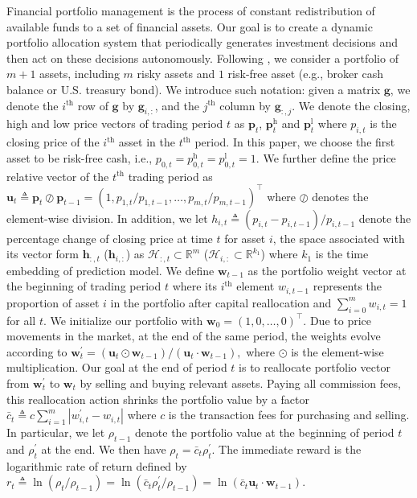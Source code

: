 \documentclass{article}
\begin{document}
Financial portfolio management is the process of constant redistribution of available funds to a set of financial assets. Our goal is to create a dynamic portfolio allocation system that periodically generates investment decisions and then act on these decisions autonomously. Following \cite{jiang2017deep}, we consider a portfolio of $m+1$ assets, including $m$ risky assets and $1$ risk-free asset (e.g., broker cash balance or U.S. treasury bond). We introduce such notation: given a matrix $\mathbf{g}$, we denote the $i^{\text{th}}$ row of $\mathbf{g}$ by $\mathbf{g}_{i,:}$, and the $j^{\text{th}}$ column by $\mathbf{g}_{:,j}$. We denote the closing, high and low price vectors of trading period $t$ as $\mathbf{p}_t$, $\mathbf{p}^{\text{h}}_t$ and $\mathbf{p}^{\text{l}}_t$ where $p_{i,t}$ is the closing price of the $i^{\text{th}}$ asset in the $t^{\text{th}}$ period. In this paper, we choose the first asset to be risk-free cash, i.e., $p_{0,t}=p_{0,t}^{\text{h}}=p_{0,t}^{\text{l}}=1$. We further define the price relative vector of the $t^{\text{th}}$ trading period as 
$
    \mathbf{u}_t\triangleq\mathbf{p}_t\oslash\mathbf{p}_{t-1}=(1,{p_{1,t}}/{p_{1,t-1}},\dots,{p_{m,t}}/{p_{m,t-1}})^\top
$
where $\oslash$ denotes the element-wise division. In addition,  we let $h_{i,t}\triangleq(p_{i,t}-p_{i,{t-1}})/p_{i,{t-1}}$ denote the percentage change of closing price at time $t$ for asset $i$, the space associated with its vector form $\mathbf{h}_{:,t}$ ($\mathbf{h}_{i,:}$) as $\mathcal{H}_{:,t}\subset\mathbb{R}^m$ ($\mathcal{H}_{i,:}\subset \mathbb{R}^{k_1}$) where $k_1$ is the time embedding of prediction model. We define $\mathbf{w}_{t-1}$ as the portfolio weight vector at the beginning of trading period $t$ where its $i^{\text{th}}$ element $w_{i,t-1}$ represents the proportion of asset $i$ in the portfolio after capital reallocation and $\sum_{i=0}^{m}w_{i,t}=1$ for all $t$. We initialize our portfolio with $\mathbf{w}_0=(1,0,\dots,0)^\top$.  Due to price movements in the market, at the end of the same period, the weights evolve according to
$\mathbf{w}_t^{'}={(\mathbf{u}_t\odot\mathbf{w}_{t-1})}/{(\mathbf{u}_t\cdot\mathbf{w}_{t-1})},$
where $\odot$ is the element-wise multiplication. Our goal at the end of period $t$ is to reallocate portfolio vector from $\mathbf{w}^{'}_t$ to $\mathbf{w}_t$ by selling and buying
relevant assets. Paying all commission fees, this reallocation action shrinks the portfolio value by a factor $\bar{c}_t\triangleq c\sum_{i=1}^m|w_{i,t}^{'}-w_{i,t}|$ where $c$ is the transaction fees for purchasing and selling. In particular, we let $\rho_{t-1}$ denote the portfolio value at the beginning of period $t$ and $\rho^{'}_{t}$ at the end. We then have $\rho_t=\bar{c}_t\rho^{'}_{t}.$ The immediate reward is the logarithmic rate of return defined by
$
    r_t\triangleq\ln({\rho_t}/{\rho_{t-1}})=\ln ({\bar{c}_t\rho^{'}_t}/{\rho_{t-1}})=\ln (\bar{c}_t\mathbf{u}_t\cdot\mathbf{w}_{t-1}).
$
\end{document}
